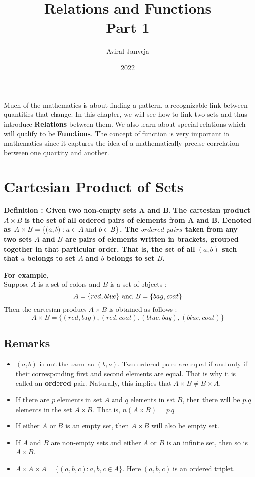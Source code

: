 \documentclass[12pt, letterpaper]{article}
\title{\textbf{\Huge Relations and Functions \\ Part 1}}
\author{Aviral Janveja}
\date{2022}
\begin{document}
\maketitle

Much of the mathematics is about finding a pattern, a recognizable link between quantities that change. In this chapter, we will see how to link two sets and thus introduce \textbf{Relations} between them. We also learn about special relations which will qualify to be \textbf{Functions}. The concept of function is very important in mathematics since it captures the idea of a mathematically precise correlation between one quantity and another.


\section{Cartesian Product of Sets}
\begin{displayquote}
\textbf{Definition : Given two non-empty sets A and B. The cartesian product $A \times B$ is the set of all ordered pairs of elements from A and B. Denoted as $A \times B = \{ (a,b): a \in A \ \textnormal{and} \ b \in B \}$. The $ordered$ $pairs$ taken from any two sets $A$ and $B$ are pairs of elements written in brackets, grouped together in that particular order. That is, the set of all $(a,b)$ such that $a$ belongs to set $A$ and $b$ belongs to set $B$.}
\end{displayquote}
\textbf{For example},\\
Suppose $A$ is a set of colors and $B$ is a set of objects : 
\begin{displaymath}
A = \{red, blue\} \textnormal{ and } B = \{bag, coat\}
\end{displaymath}
Then the cartesian product $A \times B$ is obtained as follows : 
\begin{displaymath}
A \times B = \{(red,bag), (red, coat), (blue, bag), (blue, coat)\}
\end{displaymath}

\subsection{Remarks}
\begin{itemize}
    \item $(a,b)$ is not the same as $(b,a)$. Two ordered pairs are equal if and only if their corresponding first and second elements are equal. That is why it is called an \textbf{ordered} pair. Naturally, this implies that $A \times B \neq B \times A$.
    \item If there are $p$ elements in set $A$ and $q$ elements in set $B$, then there will be $p.q$ elements in the set $A \times B$. That is, $n(A \times B) = p.q$
    \item If either $A$ or $B$ is an empty set, then $A \times B$ will also be empty set.
    \item If $A$ and $B$ are non-empty sets and either $A$ or $B$ is an infinite set, then so is $A \times B$.
    \item $A \times A \times A = \{(a,b,c): a,b,c \in A\}$. Here $(a,b,c)$ is an ordered triplet.
\end{itemize}
\end{document}
